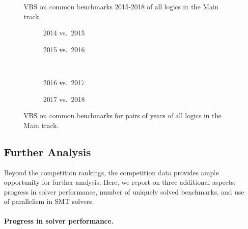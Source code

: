 \documentclass[dvipsnames,table,twoside,11pt]{article}
\begin{document}

\begin{figure}
  \centering
  \caption{VBS on common benchmarks 2015-2018 of all logics in the Main track.}
  \label{fig:progress-all}
\end{figure}

\begin{figure}
  \begin{subfigure}[t]{0.5\textwidth}
    \caption{2014 vs.~2015}
  \end{subfigure}
  \begin{subfigure}[t]{0.5\textwidth}
    \caption{2015 vs.~2016}
  \end{subfigure}
  \\[2ex]
  \begin{subfigure}[t]{0.5\textwidth}
    \caption{2016 vs.~2017}
  \end{subfigure}
  \begin{subfigure}[t]{0.5\textwidth}
    \caption{2017 vs.~2018}
  \end{subfigure}
  \caption{VBS on common benchmarks for pairs of years of all logics in the
  Main track.}
  \label{fig:progress}
\end{figure}

\subsection{Further Analysis}

Beyond the competition rankings, the competition data provides ample
opportunity for further analysis.  Here, we report on three additional
aspects: progress in solver performance, number of uniquely solved
benchmarks, and use of parallelism in SMT solvers.

\paragraph{Progress in solver performance.}
\end{document}

